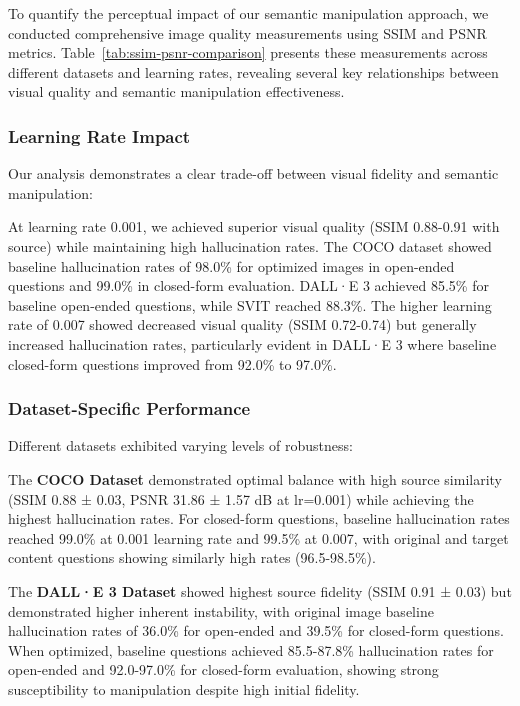 \documentclass[runningheads]{llncs}
\begin{document}
To quantify the perceptual impact of our semantic manipulation approach, we conducted comprehensive image quality measurements using SSIM and PSNR metrics. Table~\ref{tab:ssim-psnr-comparison} presents these measurements across different datasets and learning rates, revealing several key relationships between visual quality and semantic manipulation effectiveness.

\subsubsection{Learning Rate Impact}
Our analysis demonstrates a clear trade-off between visual fidelity and semantic manipulation:

At learning rate 0.001, we achieved superior visual quality (SSIM 0.88-0.91 with source) while maintaining high hallucination rates. The COCO dataset showed baseline hallucination rates of 98.0\% for optimized images in open-ended questions and 99.0\% in closed-form evaluation. DALL·E 3 achieved 85.5\% for baseline open-ended questions, while SVIT reached 88.3\%. The higher learning rate of 0.007 showed decreased visual quality (SSIM 0.72-0.74) but generally increased hallucination rates, particularly evident in DALL·E 3 where baseline closed-form questions improved from 92.0\% to 97.0\%.

\subsubsection{Dataset-Specific Performance}
Different datasets exhibited varying levels of robustness:

The \textbf{COCO Dataset} demonstrated optimal balance with high source similarity (SSIM 0.88 ± 0.03, PSNR 31.86 ± 1.57 dB at lr=0.001) while achieving the highest hallucination rates. For closed-form questions, baseline hallucination rates reached 99.0\% at 0.001 learning rate and 99.5\% at 0.007, with original and target content questions showing similarly high rates (96.5-98.5\%).

The \textbf{DALL·E 3 Dataset} showed highest source fidelity (SSIM 0.91 ± 0.03) but demonstrated higher inherent instability, with original image baseline hallucination rates of 36.0\% for open-ended and 39.5\% for closed-form questions. When optimized, baseline questions achieved 85.5-87.8\% hallucination rates for open-ended and 92.0-97.0\% for closed-form evaluation, showing strong susceptibility to manipulation despite high initial fidelity.
\end{document}
